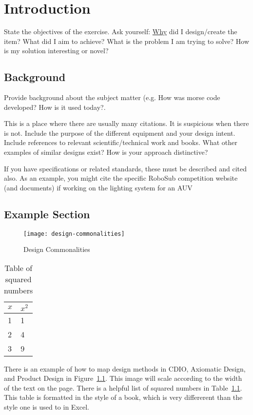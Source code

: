 \chapter{Introduction\label{cha:introduction}}
State the objectives of the exercise. Ask yourself:
\underline{Why} did I design/create the item? What did I aim to
achieve? What is the problem I am trying to solve?  How is my
solution interesting or novel?

\section{Background}
Provide background about the subject matter (e.g. How was morse code
developed?  How is it used today?.

This is a place where there are usually many citations.
It is suspicious when there is not.
Include the purpose of the different equipment and your design intent. 
Include references to relevant scientific/technical work and books.
What other examples of similar designs exist?
How is your approach distinctive?

If you have specifications or related standards, these must be
described and cited also.  As an example, you might cite the specific
RoboSub competition website (and documents) if working on the lighting system for an AUV\cite{guls2016auvlight}

\section{Example Section}
\begin{figure}
  \centering
  \texttt{[image: design-commonalities]}
  \caption[Design]{Design Commonalities\cite{foley2021dindesign}}\label{fig:ru-logo}
\end{figure}
\begin{table}
  \centering
  \begin{tabular}{ll}\toprule
    $x$& $x^{2}$\\\midrule
    1 &1\\
    2 &4\\
    3 &9\\\bottomrule
  \end{tabular}
  \caption{Table of squared numbers}\label{tab:numbers}
\end{table}
There is an example of how to map design methods in CDIO, Axiomatic Design, and Product Design in Figure~\ref{fig:ru-logo}.
This image will scale according to the width of the text on the page.
There is a helpful list of squared numbers in Table~\ref{tab:numbers}.
This table is formatted in the style of a book, which is very differerent than the style one is used to in Excel.

